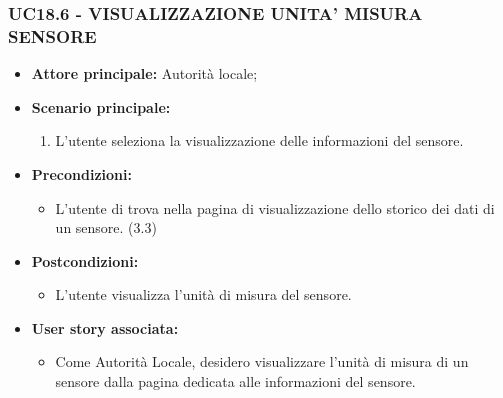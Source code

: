 \subsubsection{UC18.6 - VISUALIZZAZIONE UNITA' MISURA SENSORE}
\begin{itemize}
    \item \textbf{Attore principale:} Autorità locale;
    \item \textbf{Scenario principale:}
    \begin{enumerate}
        \item L'utente seleziona la visualizzazione delle informazioni del sensore.
    \end{enumerate}
\item \textbf{Precondizioni:}
    \begin{itemize}
        \item  L'utente di trova nella pagina di visualizzazione dello storico dei dati di un sensore. (3.3)
    \end{itemize}
    \item \textbf{Postcondizioni:}
          \begin{itemize}
              \item  L'utente visualizza l'unità di misura del sensore.
          \end{itemize}
    \item \textbf{User story associata:}
          \begin{itemize}
              \item Come Autorità Locale, desidero visualizzare l'unità di misura di un sensore dalla pagina dedicata alle informazioni del sensore.
          \end{itemize}
\end{itemize}